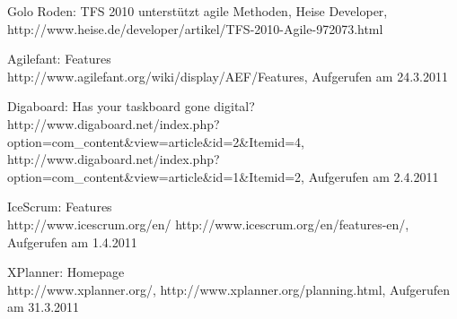\documentclass[german,english]{header}
\begin{document}
\begin{thebibliography}{5}
Golo Roden: 
TFS 2010 unterstützt agile Methoden, Heise Developer,
http://www.heise.de/developer/artikel/TFS-2010-Agile-972073.html

Agilefant: Features\\ 
http://www.agilefant.org/wiki/display/AEF/Features,
Aufgerufen am 24.3.2011

Digaboard: Has your taskboard gone digital?
http://www.digaboard.net/index.php?option=com\_content\&view=article\&id=2\&Itemid=4,
http://www.digaboard.net/index.php?option=com\_content\&view=article\&id=1\&Itemid=2,
Aufgerufen am 2.4.2011

IceScrum: Features\\
http://www.icescrum.org/en/
http://www.icescrum.org/en/features-en/,
Aufgerufen am 1.4.2011

XPlanner: Homepage\\
http://www.xplanner.org/,
http://www.xplanner.org/planning.html,
Aufgerufen am 31.3.2011

\end{thebibliography}
\end{document}
